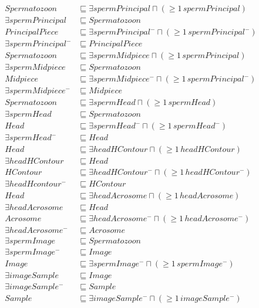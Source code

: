 \documentclass{article}
\begin{document}
\begin{align*}
Spermatozoon &\sqsubseteq \exists spermPrincipal \sqcap (\geq 1\, spermPrincipal)\\
\exists spermPrincipal &\sqsubseteq Spermatozoon \\
PrincipalPiece &\sqsubseteq \exists spermPrincipal^- \sqcap (\geq 1\, spermPrincipal^-) \\
\exists spermPrincipal^- &\sqsubseteq PrincipalPiece \\
Spermatozoon &\sqsubseteq \exists spermMidpiece \sqcap (\geq 1\, spermPrincipal)\\
\exists spermMidpiece &\sqsubseteq Spermatozoon \\
Midpiece &\sqsubseteq \exists spermMidpiece^- \sqcap(\geq 1\, spermPrincipal^-)\\
\exists spermMidpiece^- &\sqsubseteq Midpiece \\
Spermatozoon &\sqsubseteq \exists spermHead \sqcap(\geq 1\, spermHead)\\
\exists spermHead &\sqsubseteq Spermatozoon \\
Head &\sqsubseteq  \exists spermHead^- \sqcap(\geq 1\, spermHead^-)\\
\exists spermHead^- &\sqsubseteq Head \\
Head &\sqsubseteq \exists headHContour \sqcap(\geq 1\, headHContour)\\
\exists headHContour &\sqsubseteq Head\\
HContour &\sqsubseteq \exists headHContour^- \sqcap(\geq 1\, headHContour^-)\\
\exists headHcontour^- &\sqsubseteq HContour \\
Head &\sqsubseteq \exists headAcrosome \sqcap(\geq 1\, headAcrosome)\\
\exists headAcrosome &\sqsubseteq Head \\
Acrosome &\sqsubseteq \exists headAcrosome^- \sqcap(\geq 1\, headAcrosome^-)\\
\exists headAcrosome^- &\sqsubseteq Acrosome \\
\exists spermImage &\sqsubseteq Spermatozoon \\
\exists spermImage^- &\sqsubseteq Image \\
Image &\sqsubseteq \exists spermImage^- \sqcap (\geq 1\, spermImage^-)\\
\exists imageSample &\sqsubseteq Image \\
\exists imageSample^- &\sqsubseteq Sample \\
Sample &\sqsubseteq \exists imageSample^- \sqcap(\geq 1\, imageSample^-)\\

\end{align*}
\end{document}
